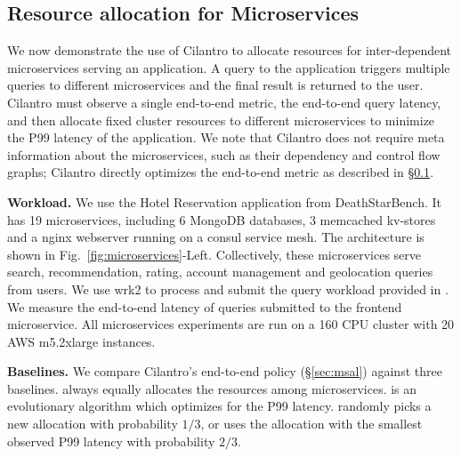 
\subsection{Resource allocation for Microservices}
\label{sec:microservices}
\vspace{-1mm}

We now demonstrate the use of Cilantro to allocate resources for inter-dependent microservices
serving an application.
A query to the application triggers multiple queries to different microservices and the final result
is returned to the user.
Cilantro must observe a single end-to-end metric, the end-to-end query latency, and then allocate
fixed cluster resources to different microservices to minimize the P99 latency of
the application.
We note that Cilantro does not require
meta information about the microservices, such as their dependency and control flow graphs;
Cilantro directly optimizes the end-to-end metric as described in \S\ref{sec:microservices}. %

\textbf{Workload.}  We use the Hotel Reservation application from
DeathStarBench\cite{deathstarbench}. It has 19 microservices, including 6 MongoDB
databases, 3 memcached kv-stores and a nginx webserver running on a consul service
mesh. The architecture is shown in Fig.~\ref{fig:microservices}-Left.
Collectively, these microservices serve search, recommendation, rating, account management and
geolocation queries from users. We use wrk2\cite{wrk2} to process and submit the query workload
provided in \cite{deathstarbench}. We measure the end-to-end latency of queries submitted to the
frontend microservice. All microservices experiments are run on a 160 CPU cluster with 20 AWS
m5.2xlarge instances.

\textbf{Baselines.}
We compare Cilantro's end-to-end policy (\S\ref{sec:msal}) against three baselines.
\equalsharems{} always equally allocates the resources among microservices.
\evoalgms{} is an evolutionary algorithm which optimizes for the P99
latency. 
\epsilongreedyms{} randomly picks a new allocation with probability $1/3$,
or uses the allocation with the smallest observed P99 latency with probability $2/3$.


